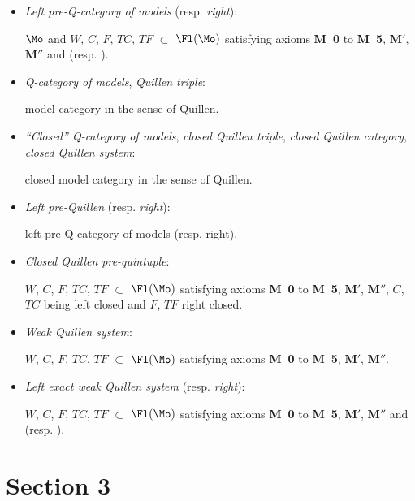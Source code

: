 \begin{itemize}
\item[\textbullet] \textit{Left pre-Q-category of models} (resp. \textit{right}):

$\Mo$ and $W$, $C$, $F$, $TC$, $TF$ $\subset$ $\Fl(\Mo)$ satisfying axioms \textbf{M~0} to \textbf{M~5}, $\mathbf{M}'$, $\mathbf{M}''$ and \Mzg{} (resp. \Mzd).

\item[\textbullet] \textit{Q-category of models}, \textit{Quillen triple}:

model category in the sense of Quillen.

\item[\textbullet] \textit{``Closed'' Q-category of models}, \textit{closed Quillen triple}, \textit{closed Quillen category}, \textit{closed Quillen system}:

closed model category in the sense of Quillen.

\item[\textbullet] \textit{Left pre-Quillen} (resp. \textit{right}):

left pre-Q-category of models (resp. right).

\item[\textbullet] \textit{Closed Quillen pre-quintuple}:

$W$, $C$, $F$, $TC$, $TF$ $\subset$ $\Fl(\Mo)$ satisfying axioms \textbf{M~0} to \textbf{M~5}, $\mathbf{M}'$, $\mathbf{M}''$, $C$, $TC$ being left closed and $F$, $TF$ right closed.

\item[\textbullet] \textit{Weak Quillen system}:

$W$, $C$, $F$, $TC$, $TF$ $\subset$ $\Fl(\Mo)$ satisfying axioms \textbf{M~0} to \textbf{M~5}, $\mathbf{M}'$, $\mathbf{M}''$.

\item[\textbullet] \textit{Left exact weak Quillen system} (resp. \textit{right}):

$W$, $C$, $F$, $TC$, $TF$ $\subset$ $\Fl(\Mo)$ satisfying axioms \textbf{M~0} to \textbf{M~5}, $\mathbf{M}'$, $\mathbf{M}''$ and \Mzg{} (resp. \Mzd).
\end{itemize}

\section*{Section 3}

